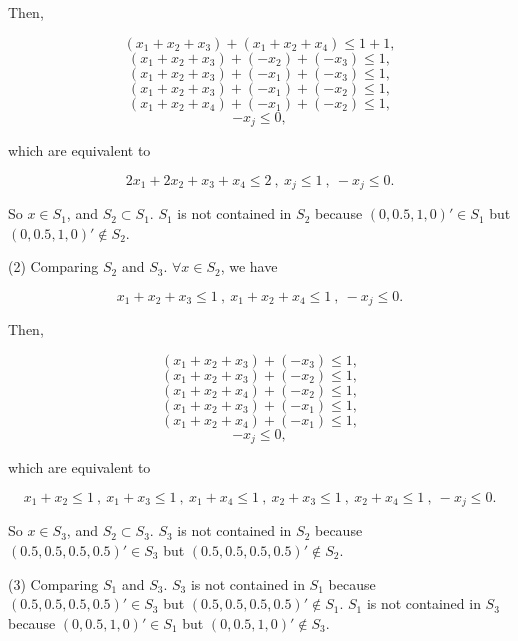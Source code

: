 Then,

$$ (x_1+x_2+x_3) + (x_1+x_2+x_4)\leq 1+1,$$
$$ (x_1+x_2+x_3) + (-x_2) + (-x_3) \leq 1, $$
$$ (x_1+x_2+x_3) + (-x_1) + (-x_3) \leq 1, $$
$$ (x_1+x_2+x_3) + (-x_1) + (-x_2) \leq 1, $$
$$ (x_1+x_2+x_4) + (-x_1) + (-x_2) \leq 1, $$
$$ -x_j\leq 0, $$

which are equivalent to 

$$ 2x_1+2x_2+x_3+x_4\leq 2~,~ x_j\leq 1~,~-x_j\leq 0.$$

So $x \in S_1$, and $S_2 \subset S_1$. $S_1$ is not contained in $S_2$ because $(0,0.5,1,0)' \in S_1 $ but $(0,0.5,1,0)' \notin S_2$.

(2) Comparing $S_2$ and $S_3$. $\forall x \in S_2$, we have

$$ x_1+x_2+x_3\leq 1~,~x_1+x_2+x_4\leq 1~,~-x_j\leq 0. $$

Then,

$$ (x_1+x_2+x_3) + (-x_3) \leq 1, $$
$$ (x_1+x_2+x_3) + (-x_2) \leq 1, $$
$$ (x_1+x_2+x_4) + (-x_2) \leq 1, $$
$$ (x_1+x_2+x_3) + (-x_1) \leq 1, $$
$$ (x_1+x_2+x_4) + (-x_1) \leq 1, $$
$$ -x_j\leq 0, $$

which are equivalent to 

$$ x_1+x_2\leq 1~,~ x_1+x_3\leq 1~,~x_1+x_4\leq 1~,~ x_2+x_3\leq 1~,~x_2+x_4\leq 1~,~ -x_j\leq 0.$$

So $x \in S_3$, and $S_2 \subset S_3$. $S_3$ is not contained in $S_2$ because $(0.5,0.5,0.5,0.5)' \in S_3 $ but $(0.5,0.5,0.5,0.5)' \notin S_2$.

(3) Comparing $S_1$ and $S_3$. $S_3$ is not contained in $S_1$ because $(0.5,0.5,0.5,0.5)' \in S_3 $ but $(0.5,0.5,0.5,0.5)' \notin S_1$. $S_1$ is not contained in $S_3$ because $(0,0.5,1,0)' \in S_1 $ but $(0,0.5,1,0)' \notin S_3$. 